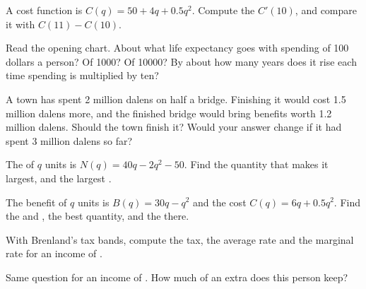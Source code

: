 \begin{exercise}[$\star$]\label{exo:g11:marginal-reasoning:3}
A cost function is $C(q) = 50 + 4q + 0.5q^2$. Compute the  $C'(10)$, and compare it with $C(11) - C(10)$.
\end{exercise}

\begin{exercise}[$\star$]\label{exo:g11:marginal-reasoning:4}
Read the opening chart. About what life expectancy goes with spending of 100 dollars a person? Of 1000? Of 10000? By about how many years does it rise each time
spending is multiplied by ten?
\end{exercise}

\begin{exercise}[$\star$]\label{exo:g11:marginal-reasoning:5}
A town has spent 2 million dalens on half a bridge. Finishing it would cost 1.5 million dalens more, and the finished bridge would bring benefits worth 1.2
million dalens. Should the town finish it? Would your answer change if it had spent 3 million dalens so far?
\end{exercise}

\begin{exercise}[$\star\star$]\label{exo:g11:marginal-reasoning:6}
The  of $q$ units is $N(q) = 40q - 2q^2 - 50$. Find the quantity that makes it largest, and the largest .
\end{exercise}

\begin{exercise}[$\star\star$]\label{exo:g11:marginal-reasoning:7}
The benefit of $q$ units is $B(q) = 30q - q^2$ and the cost $C(q) = 6q + 0.5q^2$. Find the  and , the best quantity, and the  there.
\end{exercise}

\begin{exercise}[$\star\star$]\label{exo:g11:marginal-reasoning:8}
With Brenland's tax bands, compute the tax, the average rate and the marginal rate for an income of .
\end{exercise}

\begin{exercise}[$\star\star$]\label{exo:g11:marginal-reasoning:9}
Same question for an income of . How much of an extra  does this person keep?
\end{exercise}

